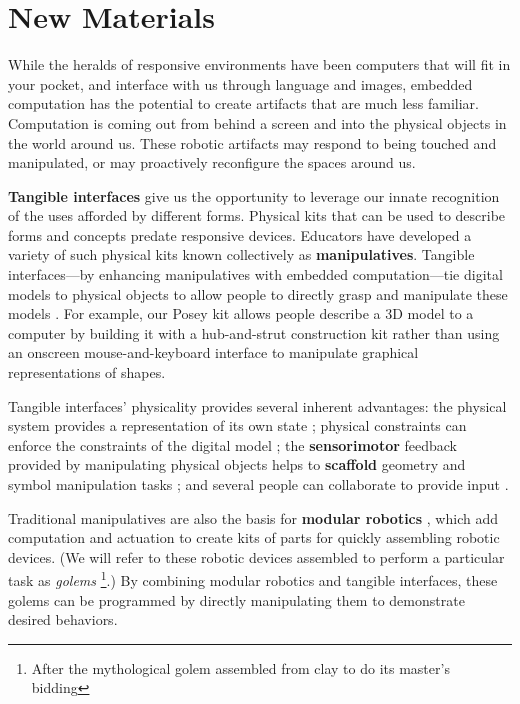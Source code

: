 \section{New Materials}
%
While the heralds of responsive environments have been computers that will fit in your pocket, and interface with us through language and images, embedded computation has the potential to create artifacts that are much less familiar.
Computation is coming out from behind a screen and into the physical objects in the world around us. These robotic artifacts may respond to being touched and manipulated, or may proactively reconfigure the spaces around us.

\textbf{Tangible interfaces} give us the opportunity to leverage our innate recognition of the uses afforded by different forms. 
Physical kits that can be used to describe forms and concepts predate responsive devices. Educators have developed a variety of such physical kits known collectively as \textbf{manipulatives}. 
Tangible interfaces---by enhancing manipulatives with embedded computation---tie digital models to physical objects to allow people to directly grasp and manipulate these models \citep{tangible_bits}.
For example, our Posey kit allows people describe a 3D model to a computer by building it with a hub-and-strut construction kit rather than using an onscreen mouse-and-keyboard interface to manipulate graphical representations of shapes.

Tangible interfaces' physicality provides several inherent advantages: the physical system provides a representation of its own state \citep{jacob_chi2008}; physical constraints can enforce the constraints of the digital model \citep{patten_chi2007}; the \textbf{sensorimotor} feedback provided by manipulating physical objects helps to \textbf{scaffold} geometry and symbol manipulation tasks \citep{nesta_tangible_learning}; and several people can collaborate to provide input \citep{handsaw,algoblock}.

Traditional manipulatives are also the basis for \textbf{modular robotics} \citep{yim_ra2007}, which add computation and actuation to create kits of parts for quickly assembling robotic devices. 
(We will refer to these robotic devices assembled to perform a particular task as \emph{golems}%
\footnote{After the mythological golem assembled from clay to do its master's bidding}.) 
By combining modular robotics and tangible interfaces, these golems can be programmed by directly manipulating them to demonstrate desired behaviors.

